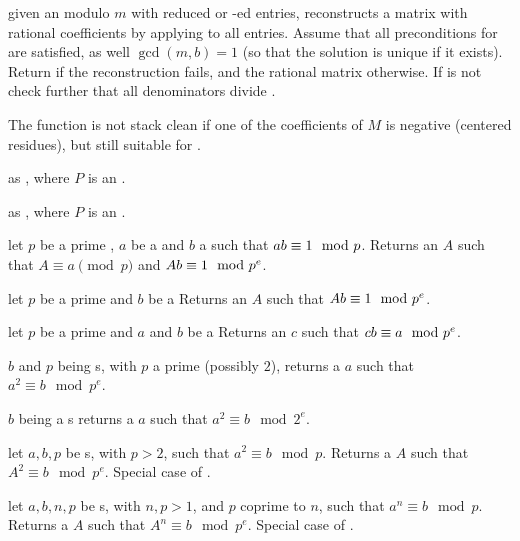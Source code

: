 given an  modulo $m$ with reduced or -ed entries,
reconstructs a matrix with rational coefficients by applying 
to all entries. Assume that all preconditions for  are
satisfied, as well $\gcd(m,b) = 1$ (so that the solution is unique if it
exists). Return  if the reconstruction fails, and the rational
matrix otherwise. If  is not  check further that all
denominators divide .

The function is not stack clean if one of the coefficients of $M$ is negative
(centered residues), but still suitable for .

 as
, where $P$ is an .

 as
, where $P$ is an .


 let
$p$ be a prime , $a$ be a  and
$b$ a  such that $a\*b \equiv 1 \mod p$.
Returns an  $A$ such that $A \equiv a \pmod{p}$ and
$A\*b \equiv 1 \mod p^e$.

 let
$p$ be a prime  and $b$ be a 
Returns an  $A$ such that $A\*b \equiv 1 \mod p^e$.

 let
$p$ be a prime  and $a$ and $b$ be a 
Returns an  $c$ such that $c\*b \equiv a \mod p^e$.

 $b$ and $p$ being s, with $p$
a prime (possibly $2$), returns a  $a$ such that $a^2 \equiv b \mod
p^e$.

 $b$ being a s
returns a  $a$ such that $a^2 \equiv b \mod 2^e$.

 let
$a,b,p$ be s, with $p > 2$, such that $a^2\equiv b\mod p$.
Returns a  $A$ such that $A^2 \equiv b \mod p^e$. Special case
of .

 let
$a,b,n,p$ be s, with $n,p > 1$, and $p$ coprime to $n$,
such that $a^n \equiv b \mod p$. Returns a  $A$ such that
$A^n \equiv b \mod p^e$. Special case of .

